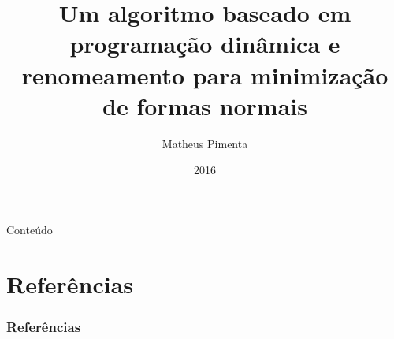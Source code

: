 \documentclass{beamer}
\title[]{Um algoritmo baseado em programação dinâmica e renomeamento para minimização de formas normais}
\author{Matheus Pimenta}
\institute[UnB]{Universidade de Brasília}
\date{2016}
\begin{document}
\begin{frame}
\titlepage
\end{frame}

\begin{frame}{Conteúdo}
  \tableofcontents
\end{frame}







\section{Referências}

\begin{frame}[allowframebreaks]
  \frametitle{Referências}
  
  
\end{frame}
\end{document}
